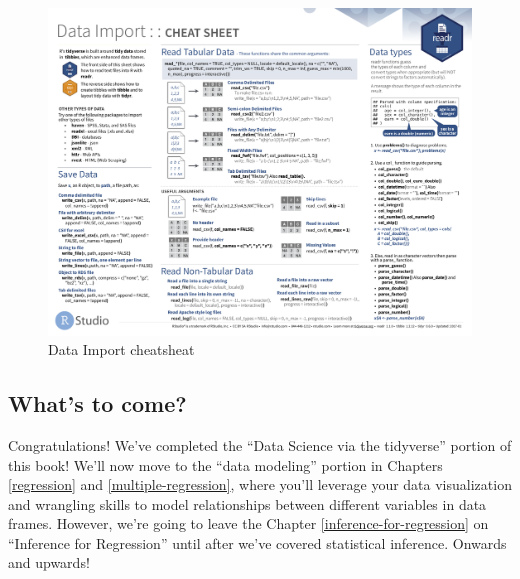 \documentclass[12pt, krantz2,]{krantz}
\begin{document}
\begin{figure}

{\centering \includegraphics[width=\textwidth]{images/import_cheatsheet-1} 

}

\caption{Data Import cheatsheat}\label{fig:import-cheatsheet}
\end{figure}

\hypertarget{whats-to-come-2}{%
\subsection{What's to come?}\label{whats-to-come-2}}

Congratulations! We've completed the ``Data Science via the tidyverse'' portion of this book! We'll now move to the ``data modeling'' portion in Chapters \ref{regression} and \ref{multiple-regression}, where you'll leverage your data visualization and wrangling skills to model relationships between different variables in data frames. However, we're going to leave the Chapter \ref{inference-for-regression} on ``Inference for Regression'' until after we've covered statistical inference. Onwards and upwards!
\end{document}
